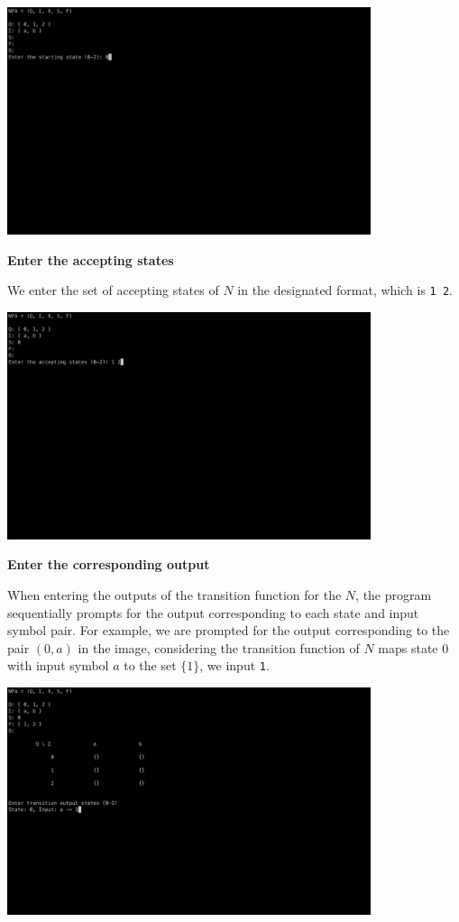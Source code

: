 \documentclass{article}
\begin{document}
\begin{center}
  \includegraphics[width=0.8\textwidth]{start}
\end{center}

\newpage

\textbf{\large Enter the accepting states}

We enter the set of accepting states of $N$ in the designated format, which is \verb|1 2|.

\begin{center}
  \includegraphics[width=0.8\textwidth]{accept}
\end{center}

\textbf{\large Enter the corresponding output}

When entering the outputs of the transition function for the $N$, the program sequentially prompts for the output corresponding to each state and input symbol pair. For example, we are prompted for the output corresponding to the pair $(0, a)$ in the image, considering the transition function of $N$ maps state 0 with input symbol $a$ to the set $\{1\}$, we input \verb|1|.

\begin{center}
  \includegraphics[width=0.8\textwidth]{trans}
\end{center}
\end{document}
